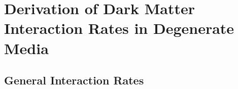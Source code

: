 \chapter{Derivation of Dark Matter Interaction Rates in Degenerate Media}
\label{app:interaction_rates}

\section{General Interaction Rates}

